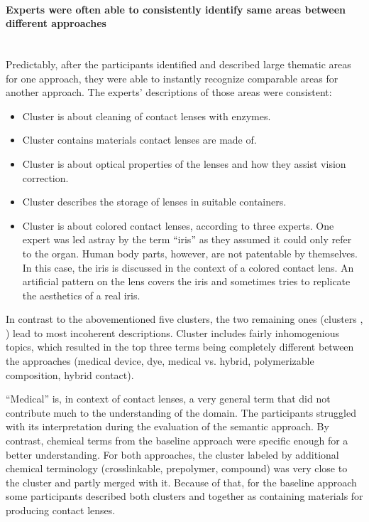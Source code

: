\paragraph{Experts were often able to consistently identify same areas between different approaches}~\\
Predictably, after the participants identified and described large thematic areas for one approach, they were able to instantly recognize comparable areas for another approach.
The experts' descriptions of those areas were consistent:
\begin{itemize}
\item Cluster  is about cleaning of contact lenses with enzymes.
\item Cluster  contains materials contact lenses are made of.
\item Cluster  is about optical properties of the lenses and how they assist vision correction.
\item Cluster  describes the storage of lenses in suitable containers.
\item Cluster  is about colored contact lenses, according to three experts. One expert was led astray by the term ``iris'' as they assumed it could only refer to the organ. Human body parts, however, are not patentable by themselves. In this case, the iris is discussed in the context of a colored contact lens. An artificial pattern on the lens covers the iris and sometimes tries to replicate the aesthetics of a real iris.
\end{itemize}

In contrast to the abovementioned five clusters, the two remaining ones (clusters , ) lead to most incoherent descriptions.
Cluster  includes fairly inhomogenious topics, which resulted in the top three terms being completely different between the approaches (medical device, dye, medical vs. hybrid, polymerizable composition, hybrid contact).

``Medical'' is, in context of contact lenses, a very general term that did not contribute much to the understanding of the domain.
The participants struggled with its interpretation during the evaluation of the semantic approach.
By contrast, chemical terms from the baseline approach were specific enough for a better understanding.
For both approaches, the cluster  labeled by additional chemical terminology (crosslinkable, prepolymer, compound) was very close to the cluster  and partly merged with it.
Because of that, for the baseline approach some participants described both clusters  and  together as containing materials for producing contact lenses.


